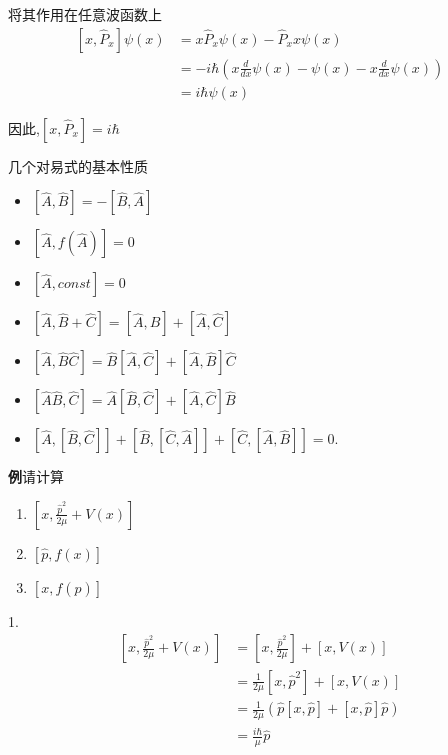 \documentclass[lang=cn,10pt]{elegantbook}
\begin{document}
将其作用在任意波函数上
\begin{equation*}
	\begin{split}
		\left[ x,\hat{P}_x \right] \psi \left( x \right) &=x\hat{P}_x\psi \left( x \right) -\hat{P}_xx\psi \left( x \right) 
		\\
		&=-i\hbar \left( x\frac{d}{dx}\psi \left( x \right) -\psi \left( x \right) -x\frac{d}{dx}\psi \left( x \right) \right) 
		\\
		&=i\hbar \psi \left( x \right) 
	\end{split}
\end{equation*}

	因此,$[x,\hat{P}_x]=i\hbar$

几个对易式的基本性质
\begin{itemize}
	\item $[ \hat{A} ,\hat{B} ]=- [ \hat{B} ,\hat{A} ]$
		\item $[\hat{A},f(\hat{A})]=0$
	\item $[\hat{A},const]=0$
	\item $[\hat{A},\hat{B}+\hat{C}]=[\hat{A},\hat{B}]+[\hat{A},\hat{C}]$
	\item $[ \hat{A} ,\hat{B}\hat{C} ]=\hat{B}[ \hat{A} ,\hat{C} ]+[ \hat{A} ,\hat{B} ] \hat{C} $
	\item $[\hat{A}\hat{B},\hat{C}]=\hat{A}[\hat{B},\hat{C}]+[\hat{A},\hat{C}]\hat{B}$
		\item $[\hat{A},[\hat{B},\hat{C}]]+[\hat{B},[\hat{C},\hat{A}]]+[\hat{C},[\hat{A},\hat{B}]]=0.$
\end{itemize}

\textbf{例}请计算
\begin{enumerate}
		\item $[x,\frac{\hat{p}^{2}}{2\mu}+V(x)]$
	\item $[\hat{p},f(x)]$
	\item $[x,f(\hat{p})]$
\end{enumerate}

1.\begin{equation*}
	\begin{split}
			[x,\frac{\hat{p}^2}{2\mu}+V(x)]&=[x,\frac{\hat{p}^2}{2\mu}]+[x,V(x)]
		\\
			&=\frac{1}{2\mu}[x,\hat{p}^2]+[x,V(x)]
		\\
			&=\frac{1}{2\mu}\left( \hat{p}[x,\hat{p}]+[x,\hat{p}]\hat{p} \right) 
		\\
			&=\frac{i\hbar}{\mu}\hat{p}
	\end{split}
\end{equation*}
\end{document}
